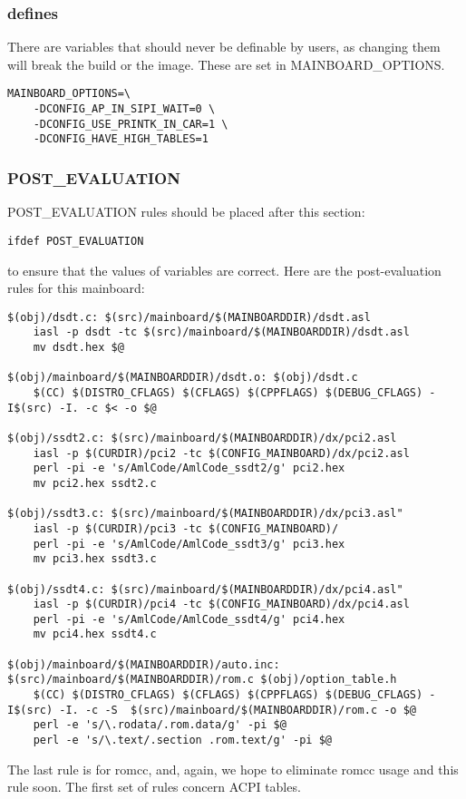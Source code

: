\documentclass[10pt,letterpaper]{article}
\begin{document}
\subsubsection{defines}
There are variables that should never be definable by users, as changing them will break the build or the image. These are set 
in MAINBOARD\_OPTIONS. 
\begin{verbatim}
MAINBOARD_OPTIONS=\
	-DCONFIG_AP_IN_SIPI_WAIT=0 \
	-DCONFIG_USE_PRINTK_IN_CAR=1 \
	-DCONFIG_HAVE_HIGH_TABLES=1
\end{verbatim}
\subsubsection{POST\_EVALUATION}
POST\_EVALUATION rules should be placed after this section: 
\begin{verbatim}
ifdef POST_EVALUATION
\end{verbatim}
to ensure that the values of variables are correct. 
Here are the post-evaluation rules for this mainboard: 
\begin{verbatim}
$(obj)/dsdt.c: $(src)/mainboard/$(MAINBOARDDIR)/dsdt.asl
	iasl -p dsdt -tc $(src)/mainboard/$(MAINBOARDDIR)/dsdt.asl
	mv dsdt.hex $@

$(obj)/mainboard/$(MAINBOARDDIR)/dsdt.o: $(obj)/dsdt.c
	$(CC) $(DISTRO_CFLAGS) $(CFLAGS) $(CPPFLAGS) $(DEBUG_CFLAGS) -I$(src) -I. -c $< -o $@

$(obj)/ssdt2.c: $(src)/mainboard/$(MAINBOARDDIR)/dx/pci2.asl
	iasl -p $(CURDIR)/pci2 -tc $(CONFIG_MAINBOARD)/dx/pci2.asl
	perl -pi -e 's/AmlCode/AmlCode_ssdt2/g' pci2.hex
	mv pci2.hex ssdt2.c

$(obj)/ssdt3.c: $(src)/mainboard/$(MAINBOARDDIR)/dx/pci3.asl"
	iasl -p $(CURDIR)/pci3 -tc $(CONFIG_MAINBOARD)/
	perl -pi -e 's/AmlCode/AmlCode_ssdt3/g' pci3.hex
	mv pci3.hex ssdt3.c
           
$(obj)/ssdt4.c: $(src)/mainboard/$(MAINBOARDDIR)/dx/pci4.asl"
	iasl -p $(CURDIR)/pci4 -tc $(CONFIG_MAINBOARD)/dx/pci4.asl
	perl -pi -e 's/AmlCode/AmlCode_ssdt4/g' pci4.hex
	mv pci4.hex ssdt4.c

$(obj)/mainboard/$(MAINBOARDDIR)/auto.inc: $(src)/mainboard/$(MAINBOARDDIR)/rom.c $(obj)/option_table.h
	$(CC) $(DISTRO_CFLAGS) $(CFLAGS) $(CPPFLAGS) $(DEBUG_CFLAGS) -I$(src) -I. -c -S  $(src)/mainboard/$(MAINBOARDDIR)/rom.c -o $@
	perl -e 's/\.rodata/.rom.data/g' -pi $@
	perl -e 's/\.text/.section .rom.text/g' -pi $@

\end{verbatim}
The last rule is for romcc, and, again, we hope to eliminate romcc usage and this rule soon. The first set of rules concern ACPI tables. 
\end{document}
